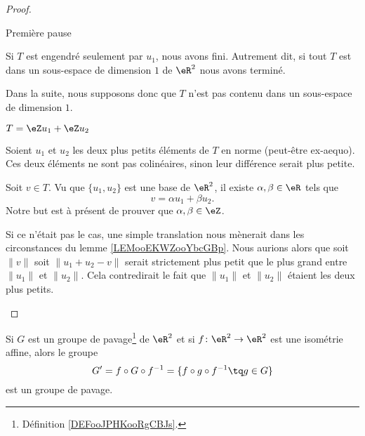 \begin{proof}
\begin{subproof}
        \item[Première pause]

            Si \( T\) est engendré seulement par \( u_1\), nous avons fini. Autrement dit, si tout \( T\) est dans un sous-espace de dimension \( 1\) de \( \eR^2\) nous avons terminé.

            Dans la suite, nous supposons donc que \( T\) n'est pas contenu dans un sous-espace de dimension \( 1\).

        \item[\( T=\eZ u_1 + \eZ u_2\)]

            Soient \( u_1\) et \( u_2\) les deux plus petits éléments de \( T\) en norme (peut-être ex-aequo). Ces deux éléments ne sont pas colinéaires, sinon leur différence serait plus petite.

            Soit \( v\in T\). Vu que \( \{ u_1,u_2 \}\) est une base de \( \eR^2\), il existe \( \alpha,\beta\in \eR\) tels que
            \begin{equation}
                v=\alpha u_1+\beta u_2.
            \end{equation}
            Notre but est à présent de prouver que \( \alpha,\beta\in \eZ\).

            Si ce n'était pas le cas, une simple translation nous mènerait dans les circonstances du lemme \ref{LEMooEKWZooYbcGBp}. Nous aurions alors que soit \( \| v \|\) soit \(\| u_1+u_2-v \|\) serait strictement plus petit que le plus grand entre \( \| u_1 \|\) et \( \| u_2 \|\). Cela contredirait le fait que \( \| u_1 \|\) et \( \| u_2 \|\) étaient les deux plus petits.
    \end{subproof}
\end{proof}

\begin{proposition}
    Si \( G\) est un groupe de pavage\footnote{Définition \ref{DEFooJPHKooRgCBJs}.} de \( \eR^2\) et si \( f\colon \eR^2\to \eR^2\) est une isométrie affine, alors le groupe
    \begin{equation}
        G'=f\circ G\circ f^{-1}=\{f\circ g\circ f^{-1}\tq g\in G\}
    \end{equation}
    est un groupe de pavage.
\end{proposition}

